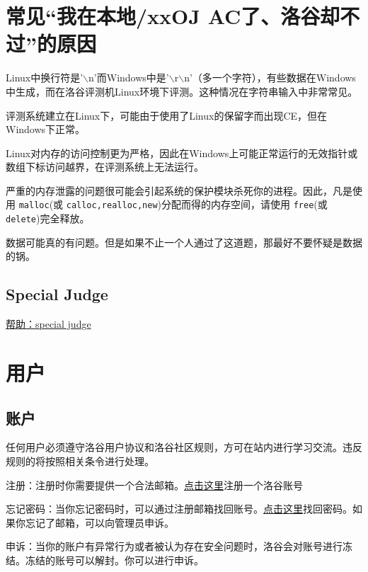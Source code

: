 \documentclass[10pt,a4paper]{article}
\begin{document}
	\section{
		常见“我在本地/xxOJ AC了、洛谷却不过”的原因}
	\begin{itemize}{
			\item 
			
			
			Linux中换行符是'$\backslash$n'而Windows中是'$\backslash$r$\backslash$n'（多一个字符），有些数据在Windows中生成，而在洛谷评测机Linux环境下评测。这种情况在字符串输入中非常常见。
			\item 
			
			
			评测系统建立在Linux下，可能由于使用了Linux的保留字而出现CE，但在Windows下正常。
			\item 
			
			
			Linux对内存的访问控制更为严格，因此在Windows上可能正常运行的无效指针或数组下标访问越界，在评测系统上无法运行。
			\item 
			
			
			严重的内存泄露的问题很可能会引起系统的保护模块杀死你的进程。因此，凡是使用
			\texttt{malloc}(或
			\texttt{calloc,realloc,new})分配而得的内存空间，请使用
			\texttt{free}(或
			\texttt{delete})完全释放。
			\item 数据可能真的有问题。但是如果不止一个人通过了这道题，那最好不要怀疑是数据的锅。}
	\end{itemize}
	
	\subsection{
		Special Judge}
	
	\href{https://www.luogu.org/wiki/show?name=%E5%B8%AE%E5%8A%A9%EF%BC%9Aspecial%20judge}{
		帮助：special judge}
	
	\section{
		用户}
	
	\subsection{
		账户}
	
	
	任何用户必须遵守洛谷用户协议和洛谷社区规则，方可在站内进行学习交流。违反规则的将按照相关条令进行处理。
	\begin{itemize}{
			\item 
			
			
			注册：注册时你需要提供一个合法邮箱。\href{https://www.luogu.org/app/exception}{点击这里}注册一个洛谷账号
			\item 
			
			
			忘记密码：当你忘记密码时，可以通过注册邮箱找回账号。\href{https://www.luogu.org/app/exception}{点击这里}找回密码。如果你忘记了邮箱，可以向管理员申诉。
			\item 
			申诉：当你的账户有异常行为或者被认为存在安全问题时，洛谷会对账号进行冻结。冻结的账号可以解封。你可以进行申诉。}
	\end{itemize}
	
\end{document}
